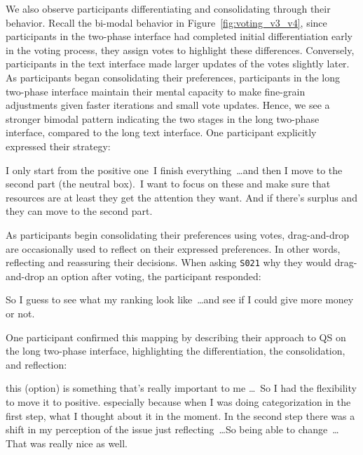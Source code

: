 We also observe participants differentiating and consolidating through their behavior. Recall the bi-modal behavior in Figure~\ref{fig:voting_v3_v4}, since participants in the two-phase interface had completed initial differentiation early in the voting process, they assign votes to highlight these differences. Conversely, participants in the text interface made larger updates of the votes slightly later. As participants began consolidating their preferences, participants in the long two-phase interface maintain their mental capacity to make fine-grain adjustments given faster iterations and small vote updates. Hence, we see a stronger bimodal pattern indicating the two stages in the long two-phase interface, compared to the long text interface. One participant explicitly expressed their strategy:

\begin{displayquote}
    I only start from the positive one~\bracketellipsis I finish everything~\ldots and then I move to the second part (the neutral box).~\bracketellipsis I want to focus on these and make sure that resources are at least they get the attention they want. And if there's surplus and they can move to the second part. \hfill{}
\end{displayquote}

As participants begin consolidating their preferences using votes, drag-and-drop are occasionally used to reflect on their expressed preferences. In other words, reflecting and reassuring their decisions. When asking \texttt{S021} why they would drag-and-drop an option after voting, the participant responded:

\begin{displayquote}
    So I guess to see what my ranking look like~\ldots and see if I could give more money or not. \hfill{}
\end{displayquote}

One participant confirmed this mapping by describing their approach to QS on the long two-phase interface, highlighting the differentiation, the consolidation, and reflection:

\begin{displayquote}
\bracketellipsis this (option) is something that's really important to me \ldots\ So I had the flexibility to move it to positive. \bracketellipsis especially because when I was doing categorization in the first step, \bracketellipsis what I thought about it in the moment. \bracketellipsis In the second step there was a shift in my perception of the issue just reflecting~\ldots So being able to change~\ldots That was really nice as well. \hfill{}
\end{displayquote}

